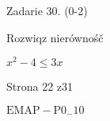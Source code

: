 \documentclass[a4paper,12pt]{article}
\begin{document}
Zadarie 30. (0-2)

Rozwiqz nierównośč

$x^{2}-4\leq 3x$

Strona 22 z31

$\mathrm{E}\mathrm{M}\mathrm{A}\mathrm{P}-\mathrm{P}0_{-}10$
\end{document}

